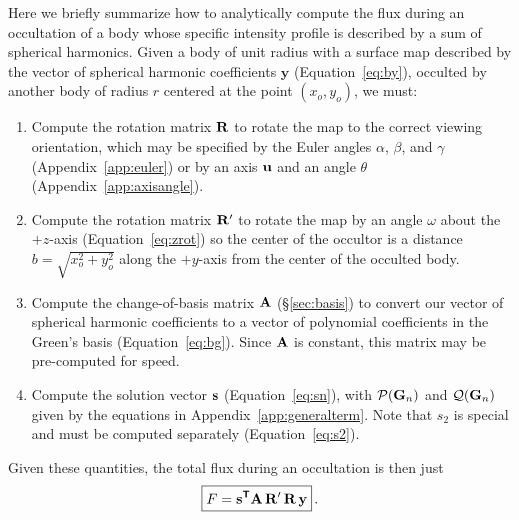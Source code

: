 \documentclass[modern]{aastex61}
\begin{document}
Here we briefly summarize how to analytically compute the flux during
an occultation of a body whose specific intensity profile is described
by a sum of spherical harmonics. Given a body of unit radius with a
surface map described by the vector of spherical harmonic coefficients
$\mathbf{y}$ (Equation~\ref{eq:by}), occulted by another body of radius $r$
centered at the point $(x_o, y_o)$, we must:
%
\begin{enumerate}
    \item Compute the rotation matrix ${\mathbf{R}}$ to rotate the map to the correct
          viewing orientation, which may be
          specified by the Euler angles $\alpha$, $\beta$, and $\gamma$
          (Appendix~\ref{app:euler}) or by an axis ${\mathbf{u}}$ and an angle $\theta$
          (Appendix~\ref{app:axisangle}).
    \item Compute the rotation matrix ${\mathbf{R'}}$ to rotate the map
          by an angle $\omega$ about the $+z$-axis
          (Equation~\ref{eq:zrot}) so the center of the occultor is a
          distance $b = \sqrt{x_o^2 + y_o^2}$ along the $+y$-axis
          from the center of the occulted body.
    \item Compute the change-of-basis matrix ${\mathbf{A}}$ (\S\ref{sec:basis}) to
          convert our vector of spherical harmonic coefficients to a vector
          of polynomial coefficients in the Green's basis
          (Equation~\ref{eq:bg}). Since ${\mathbf{A}}$ is constant,
          this matrix may be pre-computed for speed.
    \item Compute the solution vector ${\mathbf{s}}$ (Equation~\ref{eq:sn}), with
          $\mathcal{P}({\mathbf{G}}_n)$ and $\mathcal{Q}({\mathbf{G}}_n)$ given by
          the equations in Appendix~\ref{app:generalterm}.
          Note that $s_2$ is special and must be computed separately
          (Equation~\ref{eq:s2}).
\end{enumerate}
%
Given these quantities, the total flux during an occultation is then just
%
\begin{equation}
    \label{eq:starry}
    \boxed{
        F = \bvec{s}^{\boldsymbol{\mathsf{T}}} \bvec{A} \, \bvec{R'} \, \bvec{R} \, \bvec{y}
        }
    \quad.
\end{equation}   %


\end{document}
